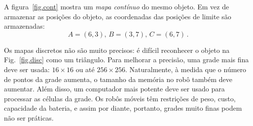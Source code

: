 
A figura~\ref{fig.cont} mostra um \emph{mapa contínuo} do mesmo objeto. Em vez de armazenar as posições do objeto, as coordenadas das posições de limite são armazenadas:
\[
A = (6,3),\, B = (3,7),\, C = (6,7)\,.
\]

Os mapas discretos não são muito precisos: é difícil reconhecer o objeto na Fig.~\ref{fig.disc} como um triângulo. Para melhorar a precisão, uma grade mais fina deve ser usada: $16\times 16$ ou até $256\times 256$. Naturalmente, à medida que o número de pontos da grade aumenta, o tamanho da memória no robô também deve aumentar. Além disso, um computador mais potente deve ser usado para processar as células da grade. Os robôs móveis têm restrições de peso, custo, capacidade da bateria, e assim por diante, portanto, grades muito finas podem não ser práticas. 

